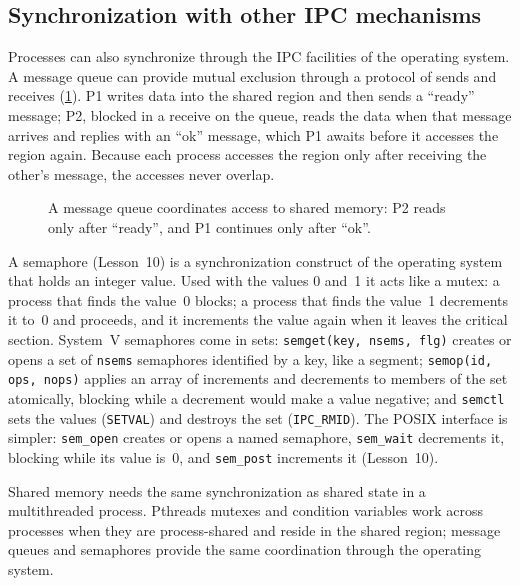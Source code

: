 \documentclass[../main.tex]{subfiles}
\begin{document}
\subsection{Synchronization with other IPC mechanisms}

Processes can also synchronize through the IPC facilities of the operating
system.  A message queue can provide mutual exclusion through a protocol of
sends and receives (\cref{fig:l09-mq-sync}).  P1 writes data into the shared region and then
sends a \enquote{ready} message; P2, blocked in a receive on the queue,
reads the data when that message arrives and replies with an \enquote{ok}
message, which P1 awaits before it accesses the region again.  Because each
process accesses the region only after receiving the other's message, the
accesses never overlap.

\begin{figure}[htbp]
  \centering
  
  \caption{A message queue coordinates access to shared memory: P2 reads
    only after \enquote{ready}, and P1 continues only after \enquote{ok}.}
  \label{fig:l09-mq-sync}
\end{figure}

A semaphore (Lesson~10) is a synchronization construct of the operating
system that holds an integer value.  Used with the values 0 and~1 it acts
like a mutex: a process that finds the value~0 blocks; a process that finds
the value~1 decrements it to~0 and proceeds, and it increments the value
again when it leaves the critical section.  System~V semaphores come in
sets: \texttt{semget(key, nsems, flg)} creates or opens a set of
\texttt{nsems} semaphores identified by a key, like a segment;
\texttt{semop(id, ops, nops)} applies an array of increments and
decrements to members of the set atomically, blocking while a decrement
would make a value negative; and \texttt{semctl} sets the values
(\texttt{SETVAL}) and destroys the set (\texttt{IPC\_RMID}).  The POSIX
interface is simpler: \texttt{sem\_open} creates or opens a named
semaphore, \texttt{sem\_wait} decrements it, blocking while its value
is~0, and \texttt{sem\_post} increments it (Lesson~10).

\begin{keypoint}
  Shared memory needs the same synchronization as shared state in a
  multithreaded process.  Pthreads mutexes and condition variables work
  across processes when they are process-shared and reside in the shared
  region; message queues and semaphores provide the same coordination
  through the operating system.
\end{keypoint}
\end{document}
